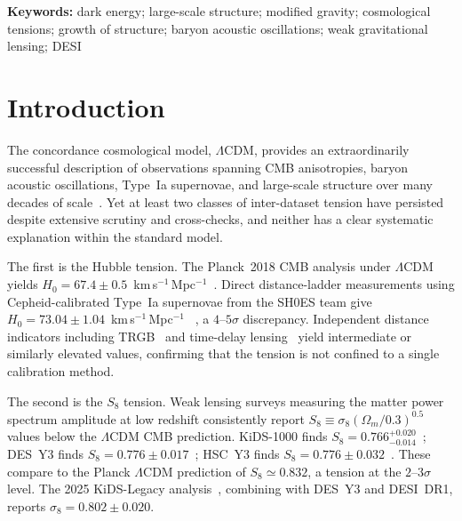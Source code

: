 \documentclass[12pt,a4paper]{article}
\newcommand{\lcdm}{$\Lambda$CDM}
\newcommand{\kms}{km\,s$^{-1}$\,Mpc$^{-1}$}
\begin{document}
\noindent\textbf{Keywords:} dark energy; large-scale structure; modified gravity;
cosmological tensions; growth of structure; baryon acoustic oscillations;
weak gravitational lensing; DESI

\newpage
\tableofcontents
\newpage

\section{Introduction}
\label{sec:intro}

The concordance cosmological model, \lcdm, provides an extraordinarily
successful description of observations spanning CMB anisotropies, baryon
acoustic oscillations, Type~Ia supernovae, and large-scale structure
over many decades of scale~\citep{Planck2018params}.
Yet at least two classes of inter-dataset tension have persisted despite
extensive scrutiny and cross-checks, and neither has a clear systematic
explanation within the standard model.

The first is the Hubble tension.
The Planck~2018 CMB analysis under \lcdm{} yields
$H_0 = 67.4 \pm 0.5$~\kms{}~\citep{Planck2018params}.
Direct distance-ladder measurements using Cepheid-calibrated Type~Ia
supernovae from the SH0ES team give $H_0 = 73.04 \pm 1.04$~\kms{}
~\citep{Riess2022}, a $4$--$5\sigma$ discrepancy.
Independent distance indicators including TRGB~\citep{Freedman2025}
and time-delay lensing~\citep{Wong2020} yield intermediate or similarly
elevated values, confirming that the tension is not confined to a single
calibration method.

The second is the $S_8$ tension.
Weak lensing surveys measuring the matter power spectrum amplitude at
low redshift consistently report $S_8 \equiv \sigma_8(\Omega_m/0.3)^{0.5}$
values below the \lcdm{} CMB prediction.
KiDS-1000 finds $S_8 = 0.766^{+0.020}_{-0.014}$~\citep{Asgari2021kids};
DES~Y3 finds $S_8 = 0.776 \pm 0.017$~\citep{Abbott2022desy3};
HSC~Y3 finds $S_8 = 0.776 \pm 0.032$~\citep{Li2023hsc}.
These compare to the Planck \lcdm{} prediction of $S_8 \simeq 0.832$,
a tension at the $2$--$3\sigma$ level.
The 2025 KiDS-Legacy analysis~\citep{Wright2025kids}, combining with DES~Y3
and DESI~DR1, reports $\sigma_8 = 0.802 \pm 0.020$.
\end{document}
